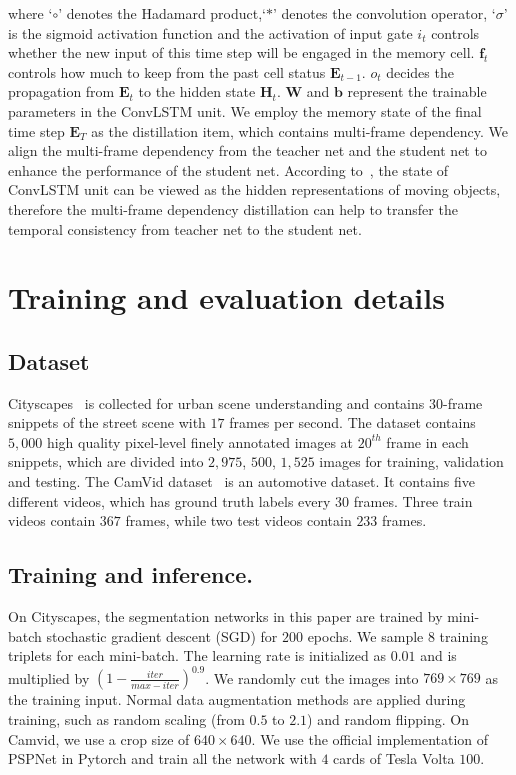 \documentclass[runningheads]{llncs}
\begin{document}
where `$\circ$' denotes the Hadamard product,`$\ast$' denotes the convolution operator, `$\sigma$' is the sigmoid activation function and the activation of input gate $i_t$ controls whether the new input of this time step will be engaged in the memory cell. $\mathbf{f}_t$ controls how much to keep from the past cell status $\mathbf{E}_{t-1}$. $o_t$ decides the propagation from $\mathbf{E}_{t}$ to the hidden state $\mathbf{H}_{t}$. $\mathbf{W}$  and $\mathbf{b}$ represent the trainable parameters in the ConvLSTM unit. We employ the memory state of the final time step $\mathbf{E}_T$ as the distillation item, which contains multi-frame dependency. We align the multi-frame dependency from the teacher net and the student net to enhance the performance of the student net. According to~\cite{ConvLSTM}, the state of ConvLSTM unit can be viewed as the hidden representations of moving objects, therefore the multi-frame dependency distillation can help to transfer the temporal consistency from teacher net to the student net.
\section{Training and evaluation details }
\subsection{Dataset}
Cityscapes~\cite{Cordts2016Cityscapes}
is collected for urban scene understanding
and contains $30$-frame snippets of the street scene with $17$ frames per second.
The dataset contains $5,000$ high quality pixel-level finely annotated images at $20^{th}$ frame in each snippets, which are divided into $2,975$, $500$,  $1,525$ images for training, validation and testing. The CamVid dataset~\cite{brostow2008segmentation} is an automotive dataset. It contains five different videos, which has ground truth labels every $30$ frames.
Three train videos contain $367$ frames, while two test videos contain $233$ frames.
\subsection{Training and inference.}
On Cityscapes, the segmentation networks in this paper are trained by mini-batch stochastic gradient descent (SGD) for $200$ epochs. We sample $8$ training triplets for each mini-batch. The learning rate is initialized as $0.01$ and is multiplied by $(1-\frac{iter}{ max-iter})^{0.9}$.  We randomly cut the images into $769 \times 769$ as the training input. Normal data augmentation methods are applied during training, such as random scaling (from $0.5$ to $2.1$) and random flipping. On Camvid, we use a crop size of $640\times 640$. We use the official implementation of PSPNet in Pytorch\cite{semseg2019} and train all the network with $4$ cards of Tesla Volta $100$.
\end{document}
